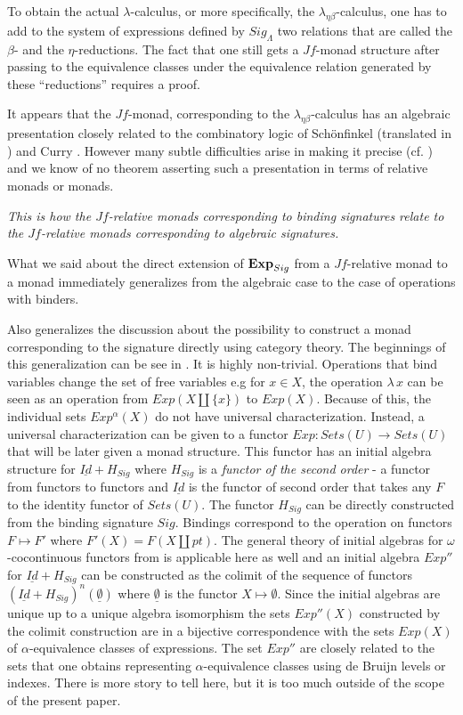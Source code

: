 \documentclass[12pt]{amsart}
\newcommand{\sr}{\rightarrow}
\newcommand{\uu}{\underline}
\begin{document}
To obtain the actual $\lambda$-calculus, or more specifically, the $\lambda_{\eta\beta}$-calculus, one has to add to the system of expressions defined by $Sig_{\Lambda}$ two relations that are called the $\beta$- and the $\eta$-reductions. The fact that one still gets a $Jf$-monad structure after passing to the equivalence classes under the equivalence relation generated by these ``reductions'' requires a proof. 

It appears that the $Jf$-monad, corresponding to the $\lambda_{\eta\beta}$-calculus has an algebraic presentation closely related to the combinatory logic of Schönfinkel \cite{Schonfinkel1924} (translated in \cite{FtoG}) and Curry \cite{Curry1930}. However many subtle difficulties arise in making it precise (cf. \cite{2002Selinger}) and we know of no theorem asserting such a presentation in terms of relative monads or monads. 

{\em This is how the $Jf$-relative monads corresponding to binding signatures relate to the $Jf$-relative monads corresponding to algebraic signatures.}

What we said about the direct extension of ${\bf Exp}_{Sig}$ from a $Jf$-relative monad to a monad immediately generalizes from the algebraic case to the case of operations with binders. 

Also generalizes the discussion about the possibility to construct a monad corresponding to the signature directly using category theory. The beginnings of this generalization can be see in \cite{FPT}. It is highly non-trivial.  Operations that bind variables change the set of free variables e.g for $x\in X$, the operation $\lambda\,x$ can be seen as an operation from $Exp(X\coprod\{x\})$ to $Exp(X)$. Because of this, the individual sets $Exp^{\alpha}(X)$ do not have universal characterization. Instead, a universal characterization can be given to a functor $Exp:Sets(U)\sr Sets(U)$ that will be later given a monad structure. This functor has an initial algebra structure for $\uu{Id}+H_{Sig}$ where $H_{Sig}$ is a {\em functor of the second order} - a functor from functors to functors and $\uu{Id}$ is the functor of second order that takes any $F$ to the identity functor of $Sets(U)$. The functor $H_{Sig}$ can be directly constructed from the binding signature $Sig$. Bindings correspond to the operation on functors $F\mapsto F'$ where $F'(X)=F(X\coprod pt)$. The general theory of initial algebras for $\omega$-cocontinuous functors from \cite{Adamek1974} is applicable here as well and an initial algebra $Exp''$ for $\uu{Id}+H_{Sig}$ can be constructed as the colimit of the sequence of functors $(\uu{Id}+H_{Sig})^n(\uu{\emptyset})$ where $\uu{\emptyset}$ is the functor $X\mapsto \emptyset$. Since the initial algebras are unique up to a unique algebra isomorphism the sets $Exp''(X)$ constructed by the colimit construction are in a bijective correspondence with the sets $Exp(X)$ of $\alpha$-equivalence classes of expressions. The set $Exp''$ are closely related to the sets that one obtains representing $\alpha$-equivalence classes using de Bruijn levels or indexes. There is more story to tell here, but it is too much outside of the scope of the present paper. 
\end{document}
